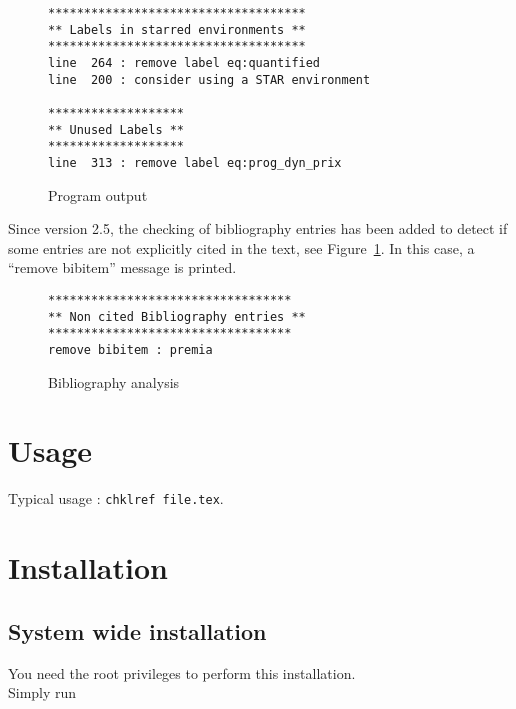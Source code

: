 \documentclass[a4paper,11pt,twoside]{article}
\begin{document}
\begin{figure}[h!]
  \centering
\begin{verbatim}
************************************
** Labels in starred environments **
************************************
line  264 : remove label eq:quantified
line  200 : consider using a STAR environment

*******************
** Unused Labels **
*******************
line  313 : remove label eq:prog_dyn_prix
\end{verbatim}
  \caption{Program output}
  \label{fig:output}
\end{figure}

Since version 2.5, the checking of bibliography entries has been added to detect
if some entries are not explicitly cited in the text, see
Figure~\ref{fig:output}. In this case, a ``remove bibitem'' message is printed.
\begin{figure}[h!]
  \centering
\begin{verbatim}
**********************************
** Non cited Bibliography entries **
**********************************
remove bibitem : premia
\end{verbatim}
  \caption{Bibliography analysis}
  \label{fig:biblio}
\end{figure}


\section{Usage}

Typical usage : \verb!chklref file.tex!.
\\

\section{Installation}


\subsection{System wide installation}

You need the root privileges to perform this installation. \\

\noindent Simply run 
\end{document}
